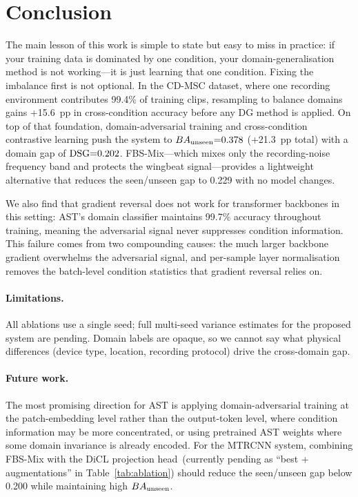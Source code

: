 \section{Conclusion}
\label{sec:conclusion}

The main lesson of this work is simple to state but easy to miss in
practice: if your training data is dominated by one condition, your
domain-generalisation method is not working---it is just learning
that one condition.
Fixing the imbalance first is not optional.
In the CD-MSC dataset, where one recording environment contributes
99.4\% of training clips, resampling to balance domains gains +15.6~pp
in cross-condition accuracy before any DG method is applied.
On top of that foundation, domain-adversarial training and
cross-condition contrastive learning push the system to $BA_{\text{unseen}}{=}0.378$
(+21.3~pp total) with a domain gap of $\mathrm{DSG}{=}0.202$.
FBS-Mix---which mixes only the recording-noise frequency band and
protects the wingbeat signal---provides a lightweight alternative that
reduces the seen/unseen gap to 0.229 with no model changes.

We also find that gradient reversal does not work for transformer
backbones in this setting: AST's domain classifier maintains 99.7\%
accuracy throughout training, meaning the adversarial signal never
suppresses condition information.
This failure comes from two compounding causes: the much larger
backbone gradient overwhelms the adversarial signal, and
per-sample layer normalisation removes the batch-level condition
statistics that gradient reversal relies on.

\paragraph{Limitations.}
All ablations use a single seed; full multi-seed variance estimates
for the proposed system are pending.
Domain labels are opaque, so we cannot say what physical differences
(device type, location, recording protocol) drive the cross-domain
gap.

\paragraph{Future work.}
The most promising direction for AST is applying domain-adversarial
training at the patch-embedding level rather than the output-token
level, where condition information may be more concentrated, or
using pretrained AST weights where some domain invariance is already
encoded.
For the MTRCNN system, combining FBS-Mix with the DiCL projection
head~(currently pending as ``best + augmentations'' in
Table~\ref{tab:ablation}) should reduce the seen/unseen gap below
0.200 while maintaining high $BA_{\text{unseen}}$.

